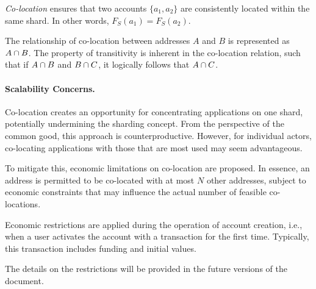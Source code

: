 \textit{Co-location} ensures that two accounts $\{a_1, a_2\}$ are consistently 
located within the same shard. 
In other words, $F_S(a_1) = F_S(a_2)$.

The relationship of co-location between addresses $A$ and $B$ 
 is represented as $A \cap B$. 
The property of transitivity is inherent in the co-location relation, 
 such that if $A \cap B$ and $B \cap C$, 
 it logically follows that $A \cap C$.

\paragraph{Scalability Concerns.} Co-location creates an opportunity for concentrating applications on one shard,
potentially undermining the sharding concept. 
From the perspective of the common good, this approach is counterproductive.
However, for individual actors, co-locating 
applications with those that are most used may seem advantageous. 

To mitigate this, economic limitations on co-location are proposed. 
In essence, an address is permitted to be co-located with at most $N$ other addresses,
 subject to economic constraints that may influence 
 the actual number of feasible co-locations.

 Economic restrictions are applied during the operation of account creation, 
i.e., when a user activates the account with a transaction for the first time.
Typically, this transaction includes funding and initial values.

The details on the restrictions will be provided in the future versions of the document.




